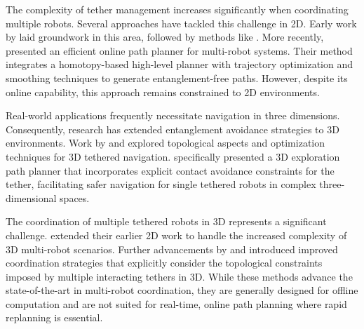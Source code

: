 The complexity of tether management increases significantly when coordinating multiple robots. Several approaches have tackled this challenge in 2D. Early work by \cite{hert1996ties} laid groundwork in this area, followed by methods like \cite{zhang2019planning}. More recently, \cite{cao2023neptune} presented an efficient online path planner for multi-robot systems. Their method integrates a homotopy-based high-level planner with trajectory optimization and smoothing techniques to generate entanglement-free paths. However, despite its online capability, this approach remains constrained to 2D environments.

Real-world applications frequently necessitate navigation in three dimensions. Consequently, research has extended entanglement avoidance strategies to 3D environments. Work by  \cite{bhattacharya2012topological} and \cite{martinez2021optimization} explored topological aspects and optimization techniques for 3D tethered navigation. \cite{petit2022tape} specifically presented a 3D exploration path planner that incorporates explicit contact avoidance constraints for the tether, facilitating safer navigation for single tethered robots in complex three-dimensional spaces.

The coordination of multiple tethered robots in 3D represents a significant challenge. \cite{hert1999motion} extended their earlier 2D work to handle the increased complexity of 3D multi-robot scenarios. Further advancements by \cite{patil2023coordinating} and  \cite{cao2023path} introduced improved coordination strategies that explicitly consider the topological constraints imposed by multiple interacting tethers in 3D. While these methods advance the state-of-the-art in multi-robot coordination, they are generally designed for offline computation and are not suited for real-time, online path planning where rapid replanning is essential.

